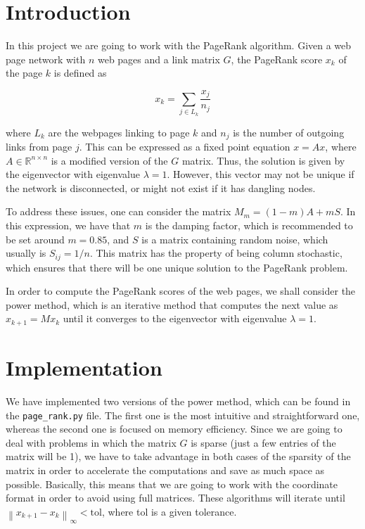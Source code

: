 \documentclass[11pt,a4paper]{article}
\newcommand{\norm}[1]{\left\lVert#1\right\rVert}
\begin{document}
\setlength{\parskip}{1em}
\setlength{\parindent}{0pt}

\section{Introduction}

In this project we are going to work with the PageRank algorithm. Given a web page network
with $n$ web pages and a link matrix $G$, the PageRank score $x_k$ of the page $k$ is defined
as

\[
  x_k = \sum_{j \in L_k} \frac{x_j}{n_j}
\]

where $L_k$ are the webpages linking to page $k$ and $n_j$ is the number of outgoing links
from page $j$. This can be expressed as a fixed point equation $x = Ax$, where
$A \in \mathbb{R}^{n \times n}$ is a modified version of the $G$ matrix. Thus, the solution
is given by the eigenvector with eigenvalue $\lambda = 1$. However, this vector may not
be unique if the network is disconnected, or might not exist if it has dangling nodes.

To address these issues, one can consider the matrix $M_m = (1 - m)A + mS$. In this expression,
we have that $m$ is the damping factor, which is recommended to be set around $m = 0.85$,
and $S$ is a matrix containing random noise, which usually is $S_{ij} = 1/n$.
This matrix has the property of being column stochastic, which ensures that there will be one unique
solution to the PageRank problem.

In order to compute the PageRank scores of the web pages, we shall consider the power method, which
is an iterative method that computes the next value as $x_{k+1} = Mx_k$ until it converges to
the eigenvector with eigenvalue $\lambda = 1$.


\section{Implementation}

We have implemented two versions of the power method, which can be found in the \texttt{page\_rank.py}
file. The first one is the most intuitive and straightforward one, whereas the second one is focused
on memory efficiency. Since we are going to deal with problems in which the matrix $G$ is sparse
(just a few entries of the matrix will be 1), we have to take advantage in both cases of the sparsity
of the matrix in order to accelerate the computations and save as much space as possible. Basically,
this means that we are going to work with the coordinate format in order to avoid using full
matrices. These algorithms will iterate until $\norm{x_{k+1} - x_k}_\infty < \text{tol}$, where tol
is a given tolerance.
\end{document}
